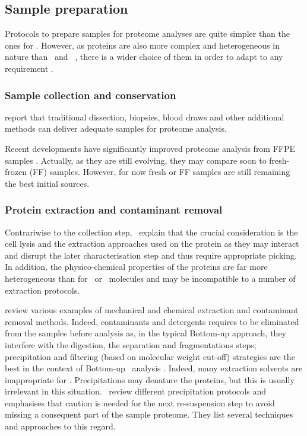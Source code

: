 \subsection{Sample preparation}\label{subsec:ProtSampPrep}
Protocols to prepare samples for proteome analyses are quite simpler than the
ones for \Rnaseq. However, as proteins are also more complex and heterogeneous in
nature than \DNA\ and \RNA\ , there is a wider choice of them
in order to adapt to any requirement .

\subsubsection{Sample collection and conservation}
\cite{Feist2015} report that traditional dissection, biopsies, blood draws and
other additional methods can deliver adequate samples for proteome analysis.

Recent developments have significantly improved proteome analysis from
\gls{FFPE} samples . Actually, as they are still evolving,
they may compare soon to fresh-frozen (\gls{FF}) samples.
However, for now fresh or \gls{FF} samples are still remaining the best initial
sources.

\subsubsection{Protein extraction and contaminant removal}
Contrariwise to the collection step,~\cite{Feist2015} explain that the crucial
consideration is the cell lysis and the extraction approaches used on
the protein as they may interact and disrupt the later characterisation step and
thus require appropriate picking. In addition, the physico-chemical properties of
the proteins are far more heterogeneous than for \DNA\ or \RNA\ molecules
 and may be incompatible to a number of extraction protocols.

\cite{Gutstein2008,Bodzon-Kulakowska2007,Visser2005,Hilbrig2003} review various
examples of mechanical and chemical extraction and contaminant removal methods.
Indeed, contaminants and detergents requires to be eliminated from the samples
before analysis as, in the typical \gls{Bottom-up} approach, they interfere
with the digestion, the separation and fragmentations steps; precipitation and
filtering (based on molecular weight cut-off) strategies are the best in the
context of \gls{Bottom-up} \ms\ analysis . Indeed, many
extraction solvents are inappropriate for \ms. Precipitations may denature the
proteins, but this is usually irrelevant in this situation.~\cite{Feist2015}
review different precipitation protocols and emphasises that caution is needed
for the next re-suspension step to avoid missing a consequent part of the
sample proteome. They list several techniques and approaches to this regard.

